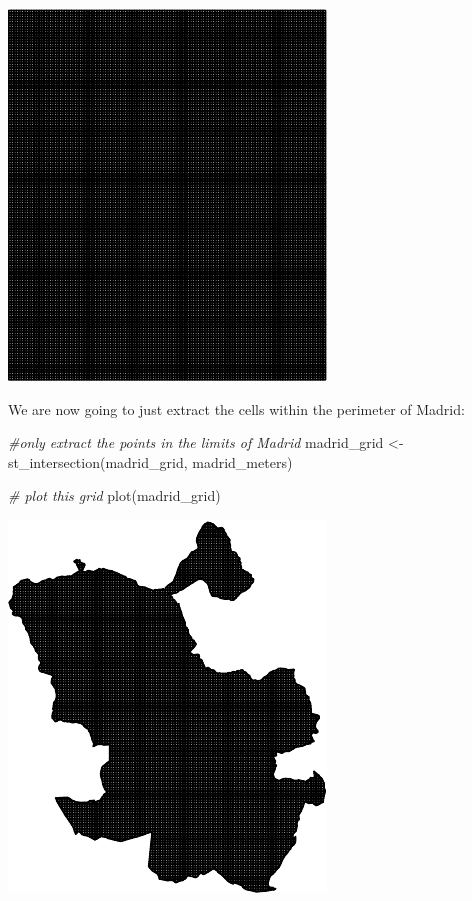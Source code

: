 \documentclass[
  krantz2]{krantz}
\makeatletter
\newenvironment{Shaded}{\begin{snugshade}}{\end{snugshade}}
\newcommand{\CommentTok}[1]{\textcolor[rgb]{0.37,0.37,0.37}{\textit{#1}}}
\newcommand{\FunctionTok}[1]{\textcolor[rgb]{0,0,0}{#1}}
\newcommand{\NormalTok}[1]{#1}
\newcommand{\OtherTok}[1]{\textcolor[rgb]{0.37,0.37,0.37}{#1}}
\newenvironment{kframe}{%
\medskip{}
\setlength{\fboxsep}{.8em}
 \def\at@end@of@kframe{}%
 \ifinner\ifhmode%
  \def\at@end@of@kframe{\end{minipage}}%
  \begin{minipage}{\columnwidth}%
 \fi\fi%
 \def\FrameCommand##1{\hskip\@totalleftmargin \hskip-\fboxsep
 \colorbox{shadecolor}{##1}\hskip-\fboxsep
     \hskip-\linewidth \hskip-\@totalleftmargin \hskip\columnwidth}%
 \MakeFramed {\advance\hsize-\width
   \@totalleftmargin\z@ \linewidth\hsize
   \@setminipage}}%
 {\par\unskip\endMakeFramed%
 \at@end@of@kframe}
\renewenvironment{Shaded}{\begin{kframe}}{\end{kframe}}
\makeatother
\begin{document}
\includegraphics{crime_mapping_files/figure-latex/unnamed-chunk-68-1.pdf}

We are now going to just extract the cells within the perimeter of Madrid:

\begin{Shaded}
\begin{Highlighting}[]
\CommentTok{\#only extract the points in the limits of Madrid}
\NormalTok{madrid\_grid }\OtherTok{\textless{}{-}} \FunctionTok{st\_intersection}\NormalTok{(madrid\_grid, madrid\_meters)   }

\CommentTok{\# plot this grid}
\FunctionTok{plot}\NormalTok{(madrid\_grid)}
\end{Highlighting}
\end{Shaded}

\includegraphics{crime_mapping_files/figure-latex/unnamed-chunk-69-1.pdf}
\end{document}
